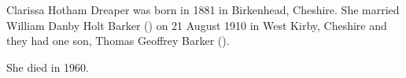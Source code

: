 
Clarissa Hotham Dreaper was born in 1881 in Birkenhead, Cheshire.
She married William Danby Holt Barker () on 21 August 1910 in West Kirby, Cheshire\cite{CheshireParishRegisters} and they had one son, Thomas Geoffrey Barker ().

She died in 1960.
